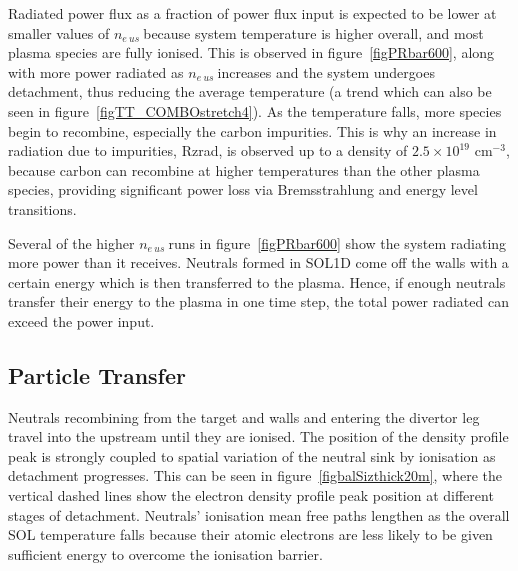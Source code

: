 \documentclass[12pt]{article}  %
\providecommand{\noNe}[1]{{${#1}\times 10^{19}$ cm$^{-3}$}} %
\providecommand{\neus}{$n_{e~us}~$} %
\begin{document}
Radiated power flux as a fraction of power flux input is expected to be lower at smaller values of \neus because system temperature is higher overall, and most plasma species are fully ionised. This is observed in figure~\ref{figPRbar600}, along with more power radiated as \neus increases and the system undergoes detachment, thus reducing the average temperature (a trend which can also be seen in figure~\ref{figTT_COMBOstretch4}). As the temperature falls, more species begin to recombine, especially the carbon impurities. This is why an increase in radiation due to impurities, Rzrad, is observed up to a density of \noNe{2.5}, because carbon can recombine at higher temperatures than the other plasma species, providing significant power loss via Bremsstrahlung and energy level transitions.

Several of the higher \neus runs in figure~\ref{figPRbar600} show the system radiating more power than it receives. Neutrals formed in SOL1D come off the walls with a certain energy which is then transferred to the plasma. Hence, if enough neutrals transfer their energy to the plasma in one time step, the total power radiated can exceed the power input.


\subsection{Particle Transfer}\label{ssecPtrans}
Neutrals recombining from the target and walls and entering the divertor leg travel into the upstream until they are ionised. The position of the density profile peak is strongly coupled to spatial variation of the neutral sink by ionisation as detachment progresses. This can be seen in figure~\ref{figbalSizthick20m}, where the vertical dashed lines show the electron density profile peak position at different stages of detachment. Neutrals' ionisation mean free paths lengthen as the overall SOL temperature falls because their atomic electrons are less likely to be given sufficient energy to overcome the ionisation barrier.
\end{document}
